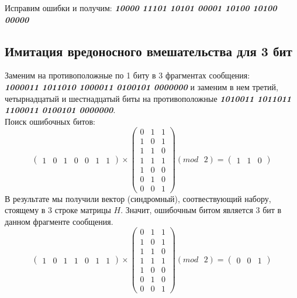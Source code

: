 \documentclass[a5paper, 10pt]{article}
\theoremstyle{definition}
\theoremstyle{plain}
\theoremstyle{remark}
\begin{document}
Исправим ошибки и получим:  \textbf{\textit{10000 11101 10101 00001 10100 10100 00000}}


\subsection{Имитация вредоносного вмешательства для 3 бит}

Заменим на противоположные по 1 биту в 3 фрагментах сообщения:\\
 \textbf{\textit{10\colorbox[rgb]{0.50, 0.5, 0.5}{0}0011 101101\colorbox[rgb]{0.50, 0.5, 0.5}{0} 1\colorbox[rgb]{0.50, 0.5, 0.5}{0}00011 0100101 0000000}} и заменим в нем третий, четырнадцатый и шестнадцатый биты на противоположные  \textbf{\textit{10\colorbox[rgb]{0.4, 0.8, 0.8}{1}0011 101101\colorbox[rgb]{0.4, 0.8, 0.8}{1} 1\colorbox[rgb]{0.4, 0.8, 0.8}{1}00011 0100101 0000000}}.\\
Поиск ошибочных битов:
\begin{equation}
\begin{pmatrix}
1 & 0 & 1 & 0 & 0 & 1 & 1
\end{pmatrix}
 \times
\begin{pmatrix}
0 & 1 & 1\\
1 & 0 & 1\\
1 & 1 & 0\\
1 & 1 & 1 \\
1 & 0 & 0\\
0 & 1 & 0 \\
0 & 0 & 1
\end{pmatrix}
(mod \text{ }2)
= \begin{pmatrix}
1 & 1 & 0 
\end{pmatrix}
\end{equation}
В результате мы получили вектор (синдромный), соотвествующий набору, стоящему в 3 строке матрицы $H$. Значит, ошибочным битом является 3 бит в данном фрагменте сообщения.\\
\begin{equation}
\begin{pmatrix}
1 & 0 & 1 & 1 & 0 & 1 & 1
\end{pmatrix}
 \times
\begin{pmatrix}
0 & 1 & 1\\
1 & 0 & 1\\
1 & 1 & 0\\
1 & 1 & 1 \\
1 & 0 & 0\\
0 & 1 & 0 \\
0 & 0 & 1
\end{pmatrix}
(mod \text{ }2)
= \begin{pmatrix}
0 & 0 & 1 
\end{pmatrix}
\end{equation}
\end{document}
